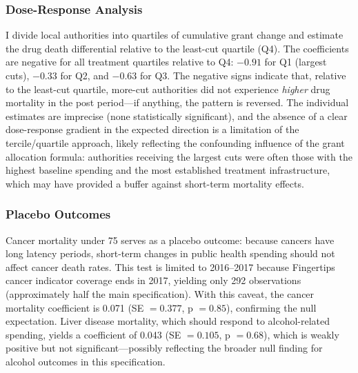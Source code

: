 \documentclass[12pt]{article}
\begin{document}
\subsubsection{Dose-Response Analysis}

I divide local authorities into quartiles of cumulative grant change and estimate the drug death differential relative to the least-cut quartile (Q4). The coefficients are negative for all treatment quartiles relative to Q4: $-0.91$ for Q1 (largest cuts), $-0.33$ for Q2, and $-0.63$ for Q3. The negative signs indicate that, relative to the least-cut quartile, more-cut authorities did not experience \textit{higher} drug mortality in the post period---if anything, the pattern is reversed. The individual estimates are imprecise (none statistically significant), and the absence of a clear dose-response gradient in the expected direction is a limitation of the tercile/quartile approach, likely reflecting the confounding influence of the grant allocation formula: authorities receiving the largest cuts were often those with the highest baseline spending and the most established treatment infrastructure, which may have provided a buffer against short-term mortality effects.

\subsubsection{Placebo Outcomes}

Cancer mortality under 75 serves as a placebo outcome: because cancers have long latency periods, short-term changes in public health spending should not affect cancer death rates. This test is limited to 2016--2017 because Fingertips cancer indicator coverage ends in 2017, yielding only 292 observations (approximately half the main specification). With this caveat, the cancer mortality coefficient is 0.071 (SE $= 0.377$, p $= 0.85$), confirming the null expectation. Liver disease mortality, which should respond to alcohol-related spending, yields a coefficient of 0.043 (SE $= 0.105$, p $= 0.68$), which is weakly positive but not significant---possibly reflecting the broader null finding for alcohol outcomes in this specification.
\end{document}
